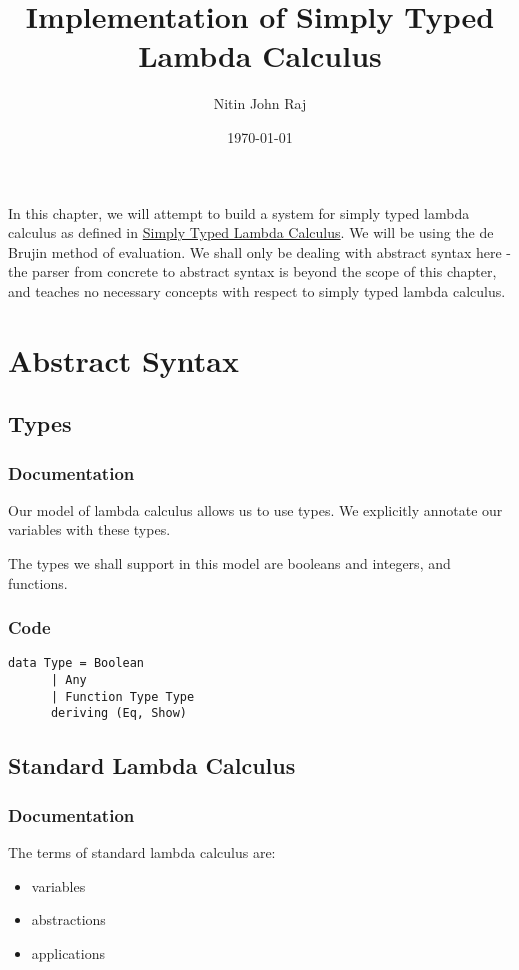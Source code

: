 \documentclass[11pt]{article}
\author{Nitin John Raj}
\date{\today}
\title{Implementation of Simply Typed Lambda Calculus}
\begin{document}
\maketitle
\tableofcontents

In this chapter, we will attempt to build a system for simply typed lambda calculus as defined in \href{../typed-lambda-calculus.org}{Simply Typed Lambda Calculus}. We will be using the de Brujin method of evaluation. We shall only be dealing with abstract syntax here - the parser from concrete to abstract syntax is beyond the scope of this chapter, and teaches no necessary concepts with respect to simply typed lambda calculus.

\section{Abstract Syntax}
\label{sec-1}
\subsection{Types}
\label{sec-1-1}
\subsubsection{Documentation}
\label{sec-1-1-1}
Our model of lambda calculus allows us to use types. We explicitly annotate our variables with these types.

The types we shall support in this model are booleans and integers, and functions.

\subsubsection{Code}
\label{sec-1-1-2}
\begin{verbatim}
data Type = Boolean
	  | Any
	  | Function Type Type
	  deriving (Eq, Show)
\end{verbatim}

\subsection{Standard Lambda Calculus}
\label{sec-1-2}
\subsubsection{Documentation}
\label{sec-1-2-1}
The terms of standard lambda calculus are:
\begin{itemize}
\item variables
\item abstractions
\item applications
\end{itemize}
\end{document}
